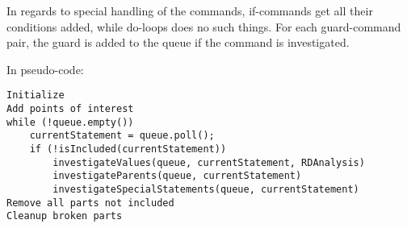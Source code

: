 In regards to special handling of the commands, if-commands get all their conditions added,
while do-loops does no such things. For each guard-command pair, the guard is added to the queue
if the command is investigated.

In pseudo-code:
\begin{lstlisting}
Initialize
Add points of interest
while (!queue.empty())
	currentStatement = queue.poll();
	if (!isIncluded(currentStatement))
		investigateValues(queue, currentStatement, RDAnalysis)
		investigateParents(queue, currentStatement)
		investigateSpecialStatements(queue, currentStatement)
Remove all parts not included
Cleanup broken parts
\end{lstlisting}

